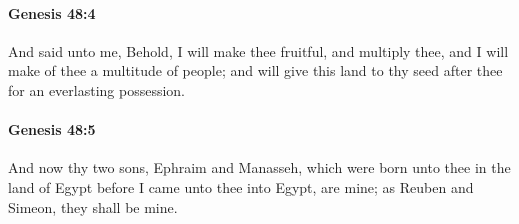 		\paragraph{Genesis 48:4} %
			\label{GENESIS-48-4}

			And said unto me, Behold, I will make thee fruitful, and multiply thee, and I will make of thee a multitude of people; and will give this land to thy seed after thee for an everlasting possession.


		\paragraph{Genesis 48:5} %
			\label{GENESIS-48-5}

			And now thy two sons, Ephraim and Manasseh, which were born unto thee in the land of Egypt before I came unto thee into Egypt, are mine; as Reuben and Simeon, they shall be mine.


